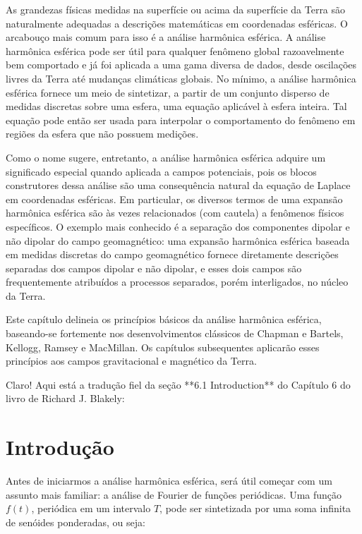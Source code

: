 

As grandezas físicas medidas na superfície ou acima da superfície da Terra são naturalmente adequadas a descrições matemáticas em coordenadas esféricas. O arcabouço mais comum para isso é a análise harmônica esférica. A análise harmônica esférica pode ser útil para qualquer fenômeno global razoavelmente bem comportado e já foi aplicada a uma gama diversa de dados, desde oscilações livres da Terra até mudanças climáticas globais. No mínimo, a análise harmônica esférica fornece um meio de sintetizar, a partir de um conjunto disperso de medidas discretas sobre uma esfera, uma equação aplicável à esfera inteira. Tal equação pode então ser usada para interpolar o comportamento do fenômeno em regiões da esfera que não possuem medições.

Como o nome sugere, entretanto, a análise harmônica esférica adquire um significado especial quando aplicada a campos potenciais, pois os blocos construtores dessa análise são uma consequência natural da equação de Laplace em coordenadas esféricas. Em particular, os diversos termos de uma expansão harmônica esférica são às vezes relacionados (com cautela) a fenômenos físicos específicos. O exemplo mais conhecido é a separação dos componentes dipolar e não dipolar do campo geomagnético: uma expansão harmônica esférica baseada em medidas discretas do campo geomagnético fornece diretamente descrições separadas dos campos dipolar e não dipolar, e esses dois campos são frequentemente atribuídos a processos separados, porém interligados, no núcleo da Terra.

Este capítulo delineia os princípios básicos da análise harmônica esférica, baseando-se fortemente nos desenvolvimentos clássicos de Chapman e Bartels, Kellogg, Ramsey e MacMillan. Os capítulos subsequentes aplicarão esses princípios aos campos gravitacional e magnético da Terra.


Claro! Aqui está a tradução fiel da seção **6.1 Introduction** do Capítulo 6 do livro de Richard J. Blakely:

\section{Introdução}


Antes de iniciarmos a análise harmônica esférica, será útil começar com um assunto mais familiar: a análise de Fourier de funções periódicas.
Uma função $f(t)$, periódica em um intervalo $T$, pode ser sintetizada por uma soma infinita de senóides ponderadas, ou seja:

